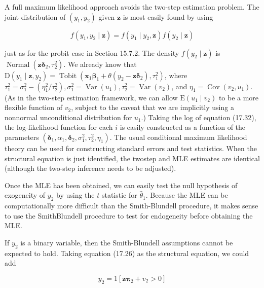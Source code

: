 \documentclass[10pt]{article}
\begin{document}
A full maximum likelihood approach avoids the two-step estimation problem. The joint distribution of $\left(y_{1}, y_{2}\right)$ given $\mathbf{z}$ is most easily found by using


\begin{equation*}
f\left(y_{1}, y_{2} \mid \mathbf{z}\right)=f\left(y_{1} \mid y_{2}, \mathbf{z}\right) f\left(y_{2} \mid \mathbf{z}\right) \tag{17.32}
\end{equation*}


just as for the probit case in Section 15.7.2. The density $f\left(y_{2} \mid \mathbf{z}\right)$ is $\operatorname{Normal}\left(\mathbf{z} \boldsymbol{\delta}_{2}, \tau_{2}^{2}\right)$. We already know that $\mathrm{D}\left(y_{1} \mid \mathbf{z}, y_{2}\right)=\operatorname{Tobit}\left(\mathbf{x}_{1} \boldsymbol{\beta}_{1}+\theta\left(y_{2}-\mathbf{z} \boldsymbol{\delta}_{2}\right), \tau_{1}^{2}\right)$, where $\tau_{1}^{2}= \sigma_{1}^{2}-\left(\eta_{1}^{2} / \tau_{2}^{2}\right), \sigma_{1}^{2}=\operatorname{Var}\left(u_{1}\right), \tau_{2}^{2}=\operatorname{Var}\left(v_{2}\right)$, and $\eta_{1}=\operatorname{Cov}\left(v_{2}, u_{1}\right)$. (As in the two-step estimation framework, we can allow $\mathrm{E}\left(u_{1} \mid v_{2}\right)$ to be a more flexible function of $v_{2}$, subject to the caveat that we are implicitly using a nonnormal unconditional distribution for $u_{1}$.) Taking the log of equation (17.32), the log-likelihood function for each $i$ is easily constructed as a function of the parameters $\left(\boldsymbol{\delta}_{1}, \alpha_{1}, \boldsymbol{\delta}_{2}, \sigma_{1}^{2}, \tau_{2}^{2}, \eta_{1}\right)$. The usual conditional maximum likelihood theory can be used for constructing standard errors and test statistics. When the structural equation is just identified, the twostep and MLE estimates are identical (although the two-step inference needs to be adjusted).

Once the MLE has been obtained, we can easily test the null hypothesis of exogeneity of $y_{2}$ by using the $t$ statistic for $\hat{\theta}_{1}$. Because the MLE can be computationally more difficult than the Smith-Blundell procedure, it makes sense to use the SmithBlundell procedure to test for endogeneity before obtaining the MLE.

If $y_{2}$ is a binary variable, then the Smith-Blundell assumptions cannot be expected to hold. Taking equation (17.26) as the structural equation, we could add


\begin{equation*}
y_{2}=1\left[\mathbf{z} \boldsymbol{\pi}_{2}+v_{2}>0\right] \tag{17.33}
\end{equation*}
\end{document}
